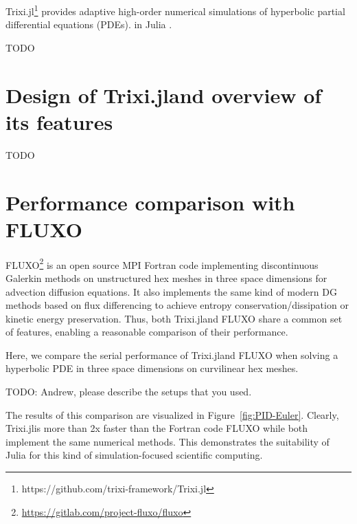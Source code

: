 \documentclass{juliacon}
\newcommand{\trixi}{Trixi.jl}
\begin{document}
\trixi\footnote{https://github.com/trixi-framework/Trixi.jl} provides adaptive
high-order numerical simulations of hyperbolic partial differential equations (PDEs).
in Julia \cite{bezanson2017julia}.

TODO %


\section{Design of \trixi and overview of its features}

TODO %


\section{Performance comparison with FLUXO}

FLUXO\footnote{\url{https://gitlab.com/project-fluxo/fluxo}} is an open source
MPI Fortran code implementing discontinuous Galerkin methods on unstructured hex
meshes in three space dimensions for advection diffusion equations. It also
implements the same kind of modern DG methods based on flux differencing
to achieve entropy conservation/dissipation or kinetic energy preservation.
Thus, both \trixi and FLUXO share a common set of features, enabling a reasonable
comparison of their performance.

Here, we compare the serial performance of \trixi and FLUXO when solving a
hyperbolic PDE in three space dimensions on curvilinear hex meshes.

TODO: Andrew, please describe the setups that you used. %

The results of this comparison are visualized in Figure~\ref{fig:PID-Euler}.
Clearly, \trixi is more than 2x faster than the Fortran code FLUXO
while both implement the same numerical methods. This demonstrates the
suitability of Julia for this kind of simulation-focused scientific computing.
\end{document}
